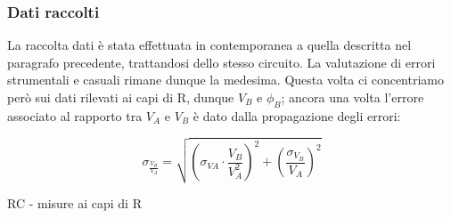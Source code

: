 \documentclass{article}
\theoremstyle{definition}
\begin{document}
\subsubsection*{Dati raccolti}
La raccolta dati è stata effettuata in contemporanea a quella descritta nel paragrafo precedente, trattandosi dello stesso circuito. La valutazione di errori strumentali e casuali rimane dunque la medesima. Questa volta ci concentriamo però sui dati rilevati ai capi di R, dunque \(V_{B}\) e \(\phi_{B}\); ancora una volta l'errore associato al rapporto tra \(V_{A}\) e \(V_{B}\) è dato dalla propagazione degli errori:

\[ \sigma_{\frac{V_{B}}{V_{A}}} = \sqrt{ \left(\sigma_{VA} \cdot \frac{V_{B}}{V_{A}^{2}}\right)^{2} + \left(\frac{\sigma_{V_{B}}}{V_{A}}\right)^{2} }\]

\begin{table}[!htbp]
\centering
    \captionsetup{labelformat=empty}
    	 \caption{RC - misure ai capi di R}
    \resizebox{11.0cm}{!}{

}
\end{table}
\end{document}
